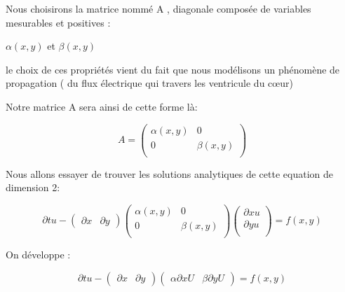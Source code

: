 \documentclass[a4paper,12pt,twoside]{report}
\begin{document}
Nous choisirons la matrice nommé A , diagonale composée de variables mesurables et positives :

 $\alpha(x,y)$ et $\beta(x,y)$

 

 le choix de ces  propriétés vient du fait que nous modélisons un phénomène de propagation ( du flux électrique qui travers les ventricule du cœur)


Notre matrice A sera ainsi de cette forme là:


\begin{equation}
A=\begin{pmatrix}\alpha(x,y)&0\\

0&\beta(x,y)\\\end{pmatrix}
 \end{equation}


Nous allons essayer de trouver les solutions analytiques de cette equation de dimension 2: 

\begin{equation}
\partial{t} u -\begin{pmatrix}\partial{x} & \partial{y}

\end{pmatrix} \begin{pmatrix}\alpha(x,y)&0\\

0&\beta(x,y)\\\end{pmatrix} \begin{pmatrix}\partial{x}u\\

\partial{y}u\\

\end{pmatrix} =f(x,y)
\end{equation}


On développe :

 

\begin{equation}
\partial{t} u -\begin{pmatrix}\partial{x} & \partial{y}

\end{pmatrix}\begin{pmatrix}\alpha \partial{x}U & \beta\partial{y} U

\end{pmatrix}=f(x,y)
\end{equation}
\end{document}
